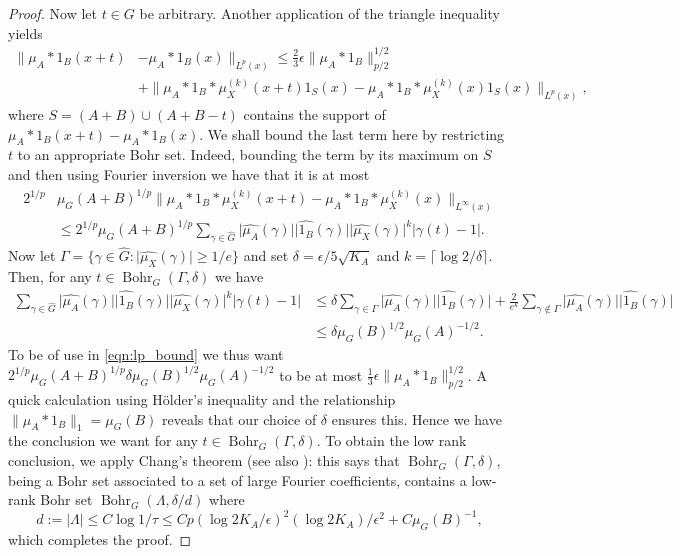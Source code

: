 \documentclass[12pt,a4paper,reqno]{amsart}
\numberwithin{equation}{section}
\theoremstyle{plain}
\theoremstyle{definition}
\renewcommand{\leq}{\leqslant}
\renewcommand{\geq}{\geqslant}
\def\Ghat{\widehat{G}}
\DeclareMathOperator{\Bohr}{Bohr}
\providecommand{\abs}[1]{\lvert#1\rvert}
\providecommand{\norm}[1]{\lVert #1 \rVert}
\providecommand{\ceiling}[1]{\lceil#1\rceil}
\theoremstyle{plain}
\begin{document}
\begin{proof}
Now let $t \in G$ be arbitrary. Another application of the triangle inequality yields
\begin{equation}
\begin{split}
\norm{ \mu_A*1_B(x+t) &- \mu_A*1_B(x) }_{L^p(x)} \leq \tfrac{2}{3}\epsilon \norm{ \mu_A*1_B }_{p/2}^{1/2} \\
&+ \norm{ \mu_A*1_B*\mu_X^{(k)}(x+t)1_S(x) - \mu_A*1_B*\mu_X^{(k)}(x)1_S(x)}_{L^p(x)},
\end{split}\label{eqn:lp_bound}
\end{equation}
where $S = (A+B) \cup (A+B-t)$ contains the support of $\mu_A*1_B(x+t) - \mu_A*1_B(x)$. We shall bound the last term here by restricting $t$ to an appropriate Bohr set. Indeed, bounding the term by its maximum on $S$ and then using Fourier inversion we have that it is at most
\begin{align*}
2^{1/p} &\mu_G(A+B)^{1/p} \norm{ \mu_A*1_B*\mu_X^{(k)}(x+t) - \mu_A*1_B*\mu_X^{(k)}(x)}_{L^\infty(x)} \\
&\leq 2^{1/p} \mu_G(A+B)^{1/p} \sum_{\gamma \in \Ghat} \abs{\widehat{\mu_A}(\gamma)} \abs{\widehat{1_B}(\gamma)} \abs{\widehat{\mu_X}(\gamma)}^k \abs{\gamma(t) - 1}.  
\end{align*}
Now let $\Gamma = \{ \gamma \in \Ghat : \abs{\widehat{\mu_X}(\gamma)} \geq 1/e \}$ and set $\delta = \epsilon/5\sqrt{K_A}$ and $k = \ceiling{ \log 2/\delta }$. Then, for any $t \in \Bohr_G(\Gamma, \delta)$ we have
\begin{align*}
\sum_{\gamma \in \Ghat} \abs{\widehat{\mu_A}(\gamma)} \abs{\widehat{1_B}(\gamma)} \abs{\widehat{\mu_X}(\gamma)}^k \abs{\gamma(t) - 1} 
&\leq \delta \sum_{\gamma \in \Gamma} \abs{\widehat{\mu_A}(\gamma)} \abs{\widehat{1_B}(\gamma)} + \frac{2}{e^k} \sum_{\gamma \notin \Gamma} \abs{\widehat{\mu_A}(\gamma)} \abs{\widehat{1_B}(\gamma)} \\
&\leq \delta \mu_G(B)^{1/2}\mu_G(A)^{-1/2}.
\end{align*}
To be of use in \eqref{eqn:lp_bound} we thus want $2^{1/p} \mu_G(A+B)^{1/p} \delta \mu_G(B)^{1/2}\mu_G(A)^{-1/2}$ to be at most $\tfrac{1}{3}\epsilon \norm{ \mu_A*1_B }_{p/2}^{1/2}$. A quick calculation using H\"older's inequality and the relationship $\norm{\mu_A*1_B}_1 = \mu_G(B)$ reveals that our choice of $\delta$ ensures this.
Hence we have the conclusion we want for any $t \in \Bohr_G(\Gamma, \delta)$. To obtain the low rank conclusion, we apply Chang's theorem \cite{chang} (see also \cite[Lemma 4.36]{tao-vu}): this says that $\Bohr_G(\Gamma, \delta)$, being a Bohr set associated to a set of large Fourier coefficients, contains a low-rank Bohr set $\Bohr_G(\Lambda, \delta/d)$ where
\[ d := \abs{\Lambda} \leq C \log{1/\tau} \leq C p (\log 2K_A/\epsilon)^2 (\log 2K_A)/\epsilon^2 + C\mu_G(B)^{-1}, \]
which completes the proof.
\end{proof}
\end{document}
